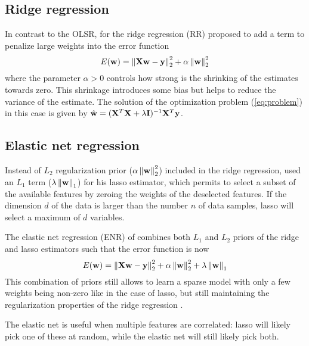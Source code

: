 \subsection{Ridge regression}

In contrast to the OLSR, for the ridge regression (RR)
\citet{Hoerl1988} proposed to add a term to penalize large weights
into the error function
\begin{equation*}
  E(\mathbf{w}) = 
  \left\| \mathbf{X}\mathbf{w} - \mathbf{y} \right\|_2^2 + 
  \alpha \left\|\mathbf{w}\right\|_2^2 
\end{equation*}
where the parameter $\alpha>0$ controls how strong is the shrinking of
the estimates towards zero.  This shrinkage introduces some bias but
helps to reduce the variance of the estimate.
%
The solution of the optimization problem (\ref{eq:problem}) in this
case is given by $\hat{\mathbf{w}}=(\mathbf{X}^T\mathbf{X} +
\lambda\mathbf{I})^{-1}\mathbf{X}^T \mathbf{y}$.

\subsection{Elastic net regression}

Instead of $L_2$ regularization prior
($\alpha\left\|\mathbf{w}\right\|_2^2$) included in the ridge regression,
\citet{Tibshirani1996} used an $L_1$ term ($\lambda
\left\|\mathbf{w}\right\|_1$) for his lasso estimator, which permits to
select a subset of the available features by zeroing the weights of
the deselected features.
%
If the dimension $d$ of the data is larger than the number $n$ of data
samples, lasso will select a maximum of $d$ variables.

The elastic net regression (ENR) of \citet{Zou2005} combines both
$L_1$ and $L_2$ priors of the ridge and lasso estimators such that the
error function is now
\begin{equation*}
  E(\mathbf{w}) = 
  \left\| \mathbf{X}\mathbf{w} - \mathbf{y} \right\|_2^2 + 
  \alpha \left\|\mathbf{w}\right\|_2^2 +
  \lambda \left\|\mathbf{w}\right\|_1 
\end{equation*}
%
This combination of priors still allows to learn a sparse model with only a 
few weights being non-zero like in the case of lasso, but still
maintaining the regularization properties of the ridge regression
\citep{scikitlearn2011}.

The elastic net is useful when multiple features are correlated: lasso
will likely pick one of these at random, while the elastic net will
still likely pick both.


